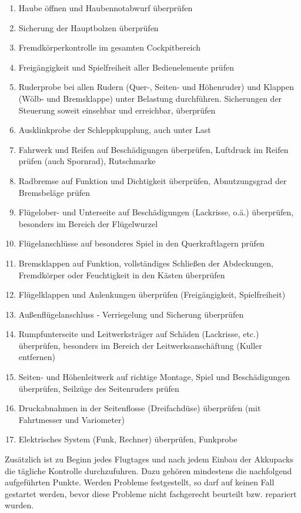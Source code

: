 \begin{enumerate}
\item Haube öffnen und Haubennotabwurf überprüfen
\item Sicherung der Hauptbolzen überprüfen
\item Fremdkörperkontrolle im gesamten Cockpitbereich
\item Freigängigkeit und Spielfreiheit aller Bedienelemente prüfen
\item Ruderprobe bei allen Rudern (Quer-, Seiten- und Höhenruder) und Klappen (Wölb- und Bremsklappe) unter Belastung durchführen. Sicherungen der Steuerung soweit einsehbar und erreichbar, überprüfen
\item Ausklinkprobe der Schleppkupplung, auch unter Last
\item Fahrwerk und Reifen auf Beschädigungen überprüfen, Luftdruck im Reifen prüfen (auch Spornrad), Rutschmarke
\item Radbremse auf Funktion und Dichtigkeit überprüfen, Abnutzungsgrad der Bremsbeläge prüfen
\item Flügelober- und Unterseite auf Beschädigungen (Lackrisse, o.ä.) überprüfen, besonders im Bereich der Flügelwurzel
\item Flügelanschlüsse auf besonderes Spiel in den Querkraftlagern prüfen
\item Bremsklappen auf Funktion, vollständiges Schließen der Abdeckungen, Fremdkörper oder Feuchtigkeit in den Kästen überprüfen
\item Flügelklappen und Anlenkungen überprüfen (Freigängigkeit, Spielfreiheit)
\item Außenflügelanschluss - Verriegelung und Sicherung überprüfen
\item Rumpfunterseite und Leitwerksträger auf Schäden (Lackrisse, etc.) 	überprüfen, besonders im Bereich der Leitwerksanschäftung (Kuller entfernen)
\item Seiten- und Höhenleitwerk auf richtige Montage, Spiel und Beschädigungen 	überprüfen, Seilzüge des Seitenruders prüfen
\item Druckabnahmen in der Seitenflosse (Dreifachdüse) überprüfen (mit 	Fahrtmesser und Variometer)
\item Elektrisches System (Funk, Rechner) überprüfen, 	Funkprobe
\end{enumerate}

Zusätzlich ist zu Beginn jedes Flugtages und nach jedem Einbau der Akkupacks die tägliche
Kontrolle durchzufuhren. Dazu gehören mindestens die nachfolgend aufgeführten Punkte.
Werden Probleme festgestellt, so darf auf keinen Fall gestartet werden, bevor diese
Probleme nicht fachgerecht beurteilt bzw. repariert wurden.


